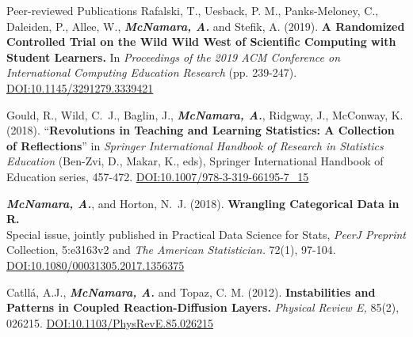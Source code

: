 \documentclass{resume} %
\begin{document}
\begin{rSection}{Peer-reviewed Publications}
Rafalski, T., Uesback, P. M., Panks-Meloney, C., Daleiden, P., Allee, W., {\bf \em McNamara, A.} and Stefik, A. (2019). {\bf A Randomized Controlled Trial on the Wild Wild West of Scientific Computing with Student Learners.} In {\em Proceedings of the 2019 ACM Conference on International Computing Education Research} (pp. 239-247). \href{https://doi.org/10.1145/3291279.3339421}{DOI:10.1145/3291279.3339421}

Gould, R., Wild, C.~J., Baglin, J., {\bf \em McNamara, A.}, Ridgway, J., McConway, K. (2018). ``\textbf{Revolutions in Teaching and Learning Statistics: A Collection of Reflections}'' in {\em Springer International Handbook of Research in Statistics Education} (Ben-Zvi, D., Makar, K., eds), Springer International Handbook of Education series, 457-472. \href{https://doi.org/10.1007/978-3-319-66195-7_15}{DOI:10.1007/978-3-319-66195-7\_15}

{\bf \em{McNamara, A.}}, and Horton, N.~J. (2018). { \bf Wrangling Categorical Data in R. } 
\\Special issue, jointly published in Practical Data Science for Stats, {\em PeerJ Preprint} Collection, 5:e3163v2 and {\em The American Statistician.} 72(1), 97-104. \href{https://doi.org/10.1080/00031305.2017.1356375}{DOI:10.1080/00031305.2017.1356375}

Catll{\'a}, A.J., {\bf \em McNamara, A.} and Topaz, C. M. (2012). {\bf Instabilities and Patterns in Coupled Reaction-Diffusion Layers.} {\em Physical Review E,} 85(2), 026215. \href{https://doi.org/10.1103/PhysRevE.85.026215}{DOI:10.1103/PhysRevE.85.026215}

\end{rSection}


\end{document}
